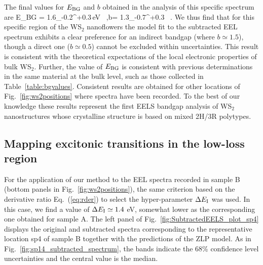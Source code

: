 The final values for $E_{\rm BG}$ and $b$ obtained in the analysis of this specific spectrum are
\be
E_{\rm BG} = 1.6_{-0.2}^{+0.3}\,{\rm eV} \, ,\quad b= 1.3_{-0.7}^{+0.3} \, .
\ee
We thus find that for this specific region of the WS$_2$ nanoflowers
the model fit to the subtracted EEL spectrum exhibits a clear preference
for an indirect bandgap (where $b\simeq 1.5$), though a direct one ($b\simeq 0.5$)
cannot be excluded within uncertainties.
%
This result is consistent with the theoretical expectations of the local
electronic properties of bulk WS$_2$.
%
Further, the value of $E_{\rm BG}$ is consistent with previous determinations
in the same material at the bulk level, such as those collected in Table~\ref{table:bgvalues}.
%
Consistent results are obtained for other locations of Fig.~\ref{fig:ws2positions}
where spectra have been recorded.
%
To the best of our knowledge
these results represent the first EELS bandgap analysis of WS$_2$ nanostructures
whose crystalline structure is based on mixed 2H/3R polytypes.

\subsection{Mapping excitonic transitions in the low-loss region}

For the application of our method to the EEL spectra recorded in sample B (bottom panels
in  Fig.~\ref{fig:ws2positions}), the same criterion
based on the derivative ratio Eq.~(\ref{eq:rder}) to select the hyper-parameter $\Delta E_{\rm I}$ was
used.
%
In this case, we find a value of $\Delta E_{\rm I}\simeq 1.4$ eV,
 somewhat lower as the corresponding one obtained for sample A.
%
The left panel of Fig.~\ref{fig:SubtractedEELS_plot_sp4} displays
the original
and subtracted spectra corresponding to the representative
location sp4 of sample B
together with the predictions of the ZLP model.
%
As in Fig.~\ref{fig:sp14_subtracted_spectrum}, the bands indicate the 68\% confidence level uncertainties
and the central value is the median.

